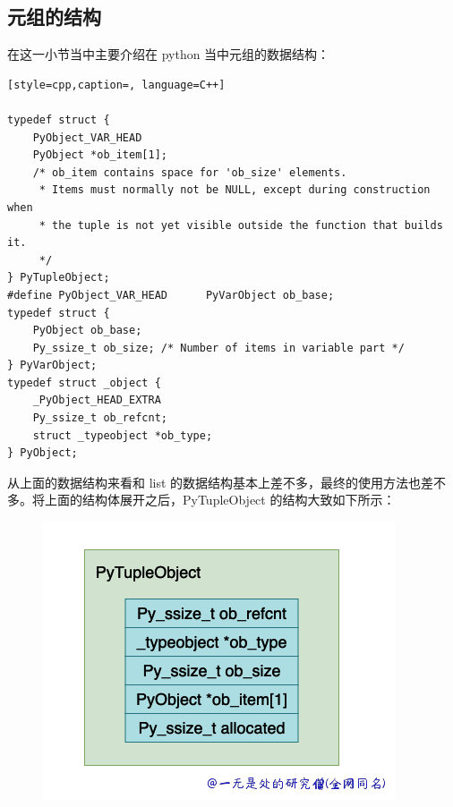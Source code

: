\subsection{元组的结构}
在这一小节当中主要介绍在 python 当中元组的数据结构：
\begin{lstlisting}[style=cpp,caption=, language=C++]

typedef struct {
    PyObject_VAR_HEAD
    PyObject *ob_item[1];
    /* ob_item contains space for 'ob_size' elements.
     * Items must normally not be NULL, except during construction when
     * the tuple is not yet visible outside the function that builds it.
     */
} PyTupleObject;
#define PyObject_VAR_HEAD      PyVarObject ob_base;
typedef struct {
    PyObject ob_base;
    Py_ssize_t ob_size; /* Number of items in variable part */
} PyVarObject;
typedef struct _object {
    _PyObject_HEAD_EXTRA
    Py_ssize_t ob_refcnt;
    struct _typeobject *ob_type;
} PyObject;
\end{lstlisting}
从上面的数据结构来看和 list 的数据结构基本上差不多，最终的使用方法也差不多。将上面的结构体展开之后，PyTupleObject 的结构大致如下所示：

    \begin{figure}[H]
        \centering
            \includegraphics[scale=.5]{images/09-tuple.png}
            \caption{ }
        \label{fig:my_label}
    \end{figure}
    

